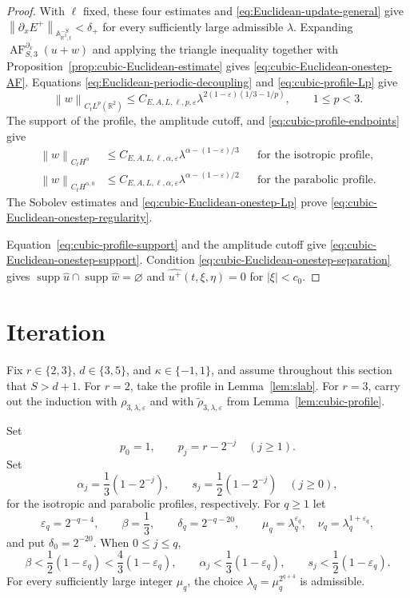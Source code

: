 \documentclass[12pt,reqno,letterpaper]{amsart}
\numberwithin{equation}{section}
\theoremstyle{definition}
\newcommand{\R}{\mathbb R}
\newcommand{\A}{\mathbb A}
\newcommand{\eps}{\varepsilon}
\newcommand{\la}{\lambda}
\newcommand{\supp}{\operatorname{supp}}
\newcommand{\norm}[1]{\left\lVert #1\right\rVert}
\newcommand{\abs}[1]{\left\lvert #1\right\rvert}
\begin{document}
\begin{proof}
With $\ell$ fixed, these four estimates and
\eqref{eq:Euclidean-update-general} give
$\norm{\partial_xE^+}_{\A^{-S}_{\R^2,t}}<\delta_+$ for every sufficiently
large admissible $\la$.
Expanding $\operatorname{AF}^{\partial_x}_{S,3}(u+w)$ and applying the
triangle inequality together with
Proposition~\ref{prop:cubic-Euclidean-estimate} gives
\eqref{eq:cubic-Euclidean-onestep-AF}.  Equations
\eqref{eq:Euclidean-periodic-decoupling} and
\eqref{eq:cubic-profile-Lp} give
\begin{equation}\label{eq:cubic-Euclidean-onestep-Lp}
 \norm w_{C_tL^p(\R^2)}
 \leq C_{E,A,L,\ell,p,\eps}
 \la^{2(1-\eps)(1/3-1/p)},
 \qquad1\leq p<3.
\end{equation}
The support of the profile, the amplitude cutoff, and
\eqref{eq:cubic-profile-endpoints} give
\begin{equation*}
 \begin{aligned}
 \norm w_{C_tH^\alpha}
 &\leq C_{E,A,L,\ell,\alpha,\eps}
 \la^{\alpha-(1-\eps)/3}
 &&\text{for the isotropic profile},\\
 \norm w_{C_tH^{\alpha,0}}
 &\leq C_{E,A,L,\ell,\alpha,\eps}
 \la^{\alpha-(1-\eps)/2}
 &&\text{for the parabolic profile}.
 \end{aligned}
\end{equation*}
The Sobolev estimates and \eqref{eq:cubic-Euclidean-onestep-Lp} prove
\eqref{eq:cubic-Euclidean-onestep-regularity}.

Equation~\eqref{eq:cubic-profile-support} and the amplitude cutoff give
\eqref{eq:cubic-Euclidean-onestep-support}.  Condition
\eqref{eq:cubic-Euclidean-onestep-separation} gives
$\supp\widehat u\cap\supp\widehat w=\varnothing$ and
$\widehat{u^+}(t,\xi,\eta)=0$ for $\abs\xi<c_0$.
\end{proof}

\section{Iteration}


Fix $r\in\{2,3\}$, $d\in\{3,5\}$, and
$\kappa\in\{-1,1\}$, and assume throughout this section that
$S>d+1$.  For $r=2$, take the profile in Lemma~\ref{lem:slab}.  For
$r=3$, carry out the induction with $\rho_{3,\la,\eps}$ and with
$\widetilde{\rho}_{3,\la,\eps}$ from
Lemma~\ref{lem:cubic-profile}.

Set
\[
 p_0=1,\qquad p_j=r-2^{-j}\quad(j\geq1).
\]
Set
\[
 \alpha_j=\frac13(1-2^{-j}),\qquad
 s_j=\frac12(1-2^{-j})\quad(j\geq0),
\]
for the isotropic and parabolic profiles, respectively.
For $q\geq1$ let
\[
 \eps_q=2^{-q-4},\qquad \beta=\frac13,\qquad
 \delta_q=2^{-q-20},\qquad
 \mu_q=\la_q^{\eps_q},\quad \nu_q=\la_q^{1+\eps_q},
\]
and put $\delta_0=2^{-20}$.  When $0\leq j\leq q$,
\[
 \beta<\frac12(1-\eps_q)<\frac43(1-\eps_q),\qquad
 \alpha_j<\frac13(1-\eps_q),\qquad
 s_j<\frac12(1-\eps_q).
\]
For every sufficiently large integer $\mu_q$, the choice
$\la_q=\mu_q^{2^{q+4}}$ is admissible.
\end{document}
